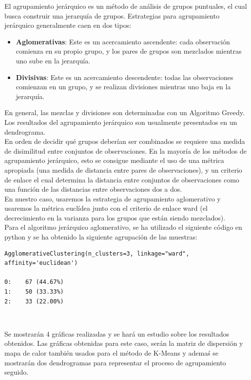 \documentclass[a4paper, 20pt]{article}
\begin{document}
El agrupamiento jerárquico es un método de análisis de grupos puntuales, el cual busca construir una jerarquía de grupos. Estrategias para agrupamiento jerárquico generalmente caen en dos tipos: 

\begin{itemize}
\item \textbf{Aglomerativas}: Este es un acercamiento ascendente: cada observación comienza en su propio grupo, y los pares de grupos son mezclados mientras uno sube en la jerarquía.
\item \textbf{Divisivas}: Este es un acercamiento descendente: todas las observaciones comienzan en un grupo, y se realizan divisiones mientras uno baja en la jerarquía.
\end{itemize}

En general, las mezclas y divisiones son determinadas con un Algoritmo Greedy. Los resultados del agrupamiento jerárquico son usualmente presentados en un dendrograma.\\

En orden de decidir qué grupos deberían ser combinados se requiere una medida de disimilitud entre conjuntos de observaciones. En la mayoría de los métodos de agrupamiento jerárquico, esto se consigue mediante el uso de una métrica apropiada (una medida de distancia entre pares de observaciones), y un criterio de enlace el cual determina la distancia entre conjuntos de observaciones como una función de las distancias entre observaciones dos a dos.\\

En nuestro caso, usaremos la estrategia de agrupamiento aglomerativo y usaremos la métrica euclídea junto con el criterio de enlace ward (el decrecimiento en la varianza para los grupos que están siendo mezclados).\\

Para el algoritmo jerárquico aglomerativo, se ha utilizado el siguiente código en python y se ha obtenido la siguiente agrupación de las muestras:\\

\begin{lstlisting}
AgglomerativeClustering(n_clusters=3, linkage="ward", affinity='euclidean')

0:    67 (44.67%)
1:    50 (33.33%)
2:    33 (22.00%)
\end{lstlisting}\

Se mostrarán 4 gráficas realizadas y se hará un estudio sobre los resultados obtenidos. Las gráficas obtenidas para este caso, serán la matriz de dispersión y mapa de calor también usados para el método de K-Means y ademaś se mostrarán dos dendrogramas para representar el proceso de agrupamiento seguido.\\
\end{document}
